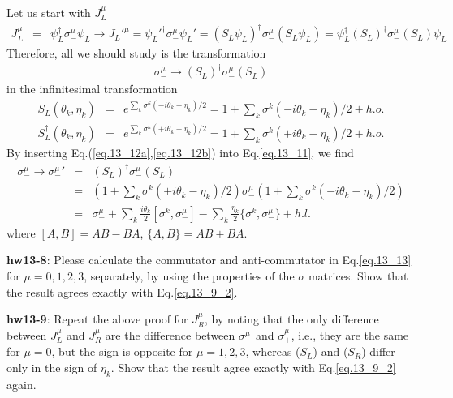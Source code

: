 \documentclass[12pt]{article}
\begin{document}
  Let us start with $J_L^\mu$
\begin{eqnarray}
  J_L^\mu
  &=& \psi_L^\dagger \sigma_-^\mu \psi_L
  \to J_L'^\mu
  = \psi_L'^\dagger \sigma_-^\mu \psi_L'
  = (S_L \psi_L)^\dagger \sigma_-^\mu (S_L \psi_L)
  = \psi_L^\dagger (S_L)^\dagger \sigma_-^\mu (S_L) \psi_L \label{eq.13_10_2}
\end{eqnarray}
  Therefore, all we should study is the transformation
\begin{eqnarray}
  \sigma_-^\mu \to (S_L)^\dagger \sigma_-^\mu (S_L) \label{eq.13_11}
\end{eqnarray}
  in the infinitesimal transformation
\begin{eqnarray}
  S_L(\theta_k,\eta_k)
  &=& e^{ \sum_k \sigma^k (-i\theta_k -\eta_k)/2}
  = 1 + \sum_k \sigma^k (-i\theta_k -\eta_k)/2 + h.o. \label{eq.13_12a} \\
  S_L^\dagger(\theta_k,\eta_k)
  &=& e^{ \sum_k \sigma^k (+i\theta_k -\eta_k)/2}
  = 1 + \sum_k \sigma^k (+i\theta_k -\eta_k)/2 + h.o. \label{eq.13_12b}
\end{eqnarray}
  By inserting Eq.(\ref{eq.13_12a},\ref{eq.13_12b}) into Eq.\ref{eq.13_11}, we find
\begin{eqnarray}
  \sigma_-^\mu
    \to {\sigma_-^\mu}'
    &=& (S_L)^\dagger \sigma_-^\mu (S_L) \\
    &=& (1 + \sum_k \sigma^k (+i\theta_k -\eta_k)/2 )
      \sigma_-^\mu
      (1 + \sum_k \sigma^k (-i\theta_k -\eta_k)/2 ) \\ 
    &=& \sigma_-^\mu
     +\sum_k \frac{i\theta_k}{2} [\sigma^k,\sigma_-^\mu]
     -\sum_k \frac{\eta_k}{2}  \{ \sigma^k,\sigma_-^\mu \} + h.l. \label{eq.13_13}
\end{eqnarray}
  where $[A,B] = AB-BA$, $\{A,B\}=AB+BA$.

{\bf hw13-8}: Please calculate the commutator and anti-commutator in Eq.\ref{eq.13_13} for $\mu=0, 1, 2, 3$, separately, by using the properties of the
  $\sigma$ matrices.  Show that the result agrees exactly with Eq.\ref{eq.13_9_2}.

{\bf hw13-9}: Repeat the above proof for $J_R^\mu$, by noting that the only
  difference between $J_L^\mu$ and $J_R^\mu$ are the difference between
  $\sigma_-^\mu$ and $\sigma_+^\mu$, i.e., they are the same for $\mu=0$,
  but the sign is opposite for $\mu=1,2,3$, whereas ($S_L$) and ($S_R$) differ
  only in the sign of $\eta_k$.  Show that the result agree exactly
  with Eq.\ref{eq.13_9_2} again.
\end{document}
